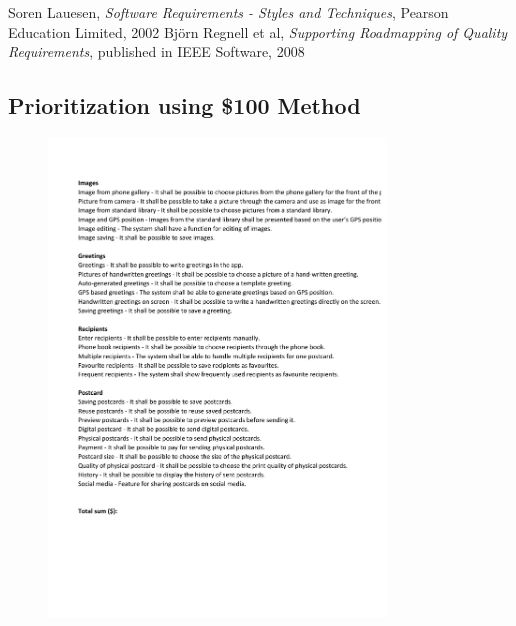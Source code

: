 \documentclass[10pt,a4paper]{article}
\begin{document}
\begin{thebibliography}{99}
	Soren Lauesen,
  	\emph{Software Requirements - Styles and Techniques},
  	Pearson Education Limited, 2002
	Björn Regnell et al,
	\emph{Supporting Roadmapping of Quality Requirements},
	published in IEEE Software, 2008

\end{thebibliography}

\newpage
\begin{appendices}

\section{Prioritization using \$100 Method}
\begin{figure}[h!]
\centering
\includegraphics[width=0.8\textwidth]{100Method.pdf}
\end{figure}


\end{appendices}
\end{document}
